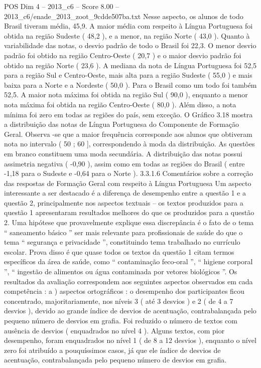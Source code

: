 \begin{textsample}{POS Dim 4 – 2013\_c6 – Score 8.00 – 2013\_c6/enade\_2013\_zoot\_9cdde507ba.txt}
Nesse aspecto, os alunos de todo Brasil tiveram média, 45,9.
A maior média com respeito à Língua Portuguesa foi obtida na região Sudeste ( 48,2 ), e a menor, na região Norte ( 43,0 ).
Quanto à variabilidade das notas, o desvio padrão de todo o Brasil foi 22,3.
O menor desvio padrão foi obtido na região Centro-Oeste ( 20,7 ) e o maior desvio padrão foi obtido na região Norte ( 23,6 ).
A mediana da nota de Língua Portuguesa foi 52,5 para a região Sul e Centro-Oeste, mais alta para a região Sudeste ( 55,0 ) e mais baixa para a Norte e a Nordeste ( 50,0 ).
Para o Brasil como um todo foi também 52,5.
A maior nota máxima foi obtida na região Sul ( 90,0 ), enquanto a menor nota máxima foi obtida na região Centro-Oeste ( 80,0 ).
Além disso, a nota mínima foi zero em todas as regiões do país, sem exceção.
O Gráfico 3.18 mostra a distribuição das notas de Língua Portuguesa do Componente de Formação Geral.
Observa -se que a maior frequência corresponde aos alunos que obtiveram nota no intervalo ( 50 ; 60 ], correspondendo à moda da distribuição.
As questões em branco constituem uma moda secundária.
A distribuição das notas possui assimetria negativa ( -0,90 ), assim como em todas as regiões do Brasil ( entre -1,18 para o Sudeste e -0,64 para o Norte ). 3.3.1.6 Comentários sobre a correção das respostas de Formação Geral com respeito à Língua Portuguesa Um aspecto interessante a ser destacado é a diferença de desempenho entre a questão 1 e a questão 2, principalmente nos aspectos textuais – os textos produzidos para a questão 1 apresentaram resultados melhores do que os produzidos para a questão 2.
Uma hipótese que provavelmente explique essa discrepância é o fato de o tema “ saneamento básico ” ser mais relevante para profissionais de saúde do que o tema “ segurança e privacidade ”, constituindo tema trabalhado no currículo escolar.
Prova disso é que quase todos os textos da questão 1 citam termos específicos da área de saúde, como “ contaminação feco-oral ”, “ higiene corporal ”, “ ingestão de alimentos ou água contaminada por vetores biológicos ”.
Os resultados da avaliação correspondem aos seguintes aspectos observados em cada competência : a ) aspectos ortográficos : o desempenho dos participantes ficou concentrado, majoritariamente, nos níveis 3 ( até 3 desvios ) e 2 ( de 4 a 7 desvios ), devido ao grande índice de desvios de acentuação, contrabalançada pelo pequeno número de desvios em grafia.
Foi reduzido o número de textos com ausência de desvios ( enquadrados no nível 4 ).
Alguns textos, com pior desempenho, foram enquadrados no nível 1 ( de 8 a 12 desvios ), enquanto o nível zero foi atribuído a pouquíssimos casos, já que ele índice de desvios de acentuação, contrabalançada pelo pequeno número de desvios em grafia.

\end{textsample}
